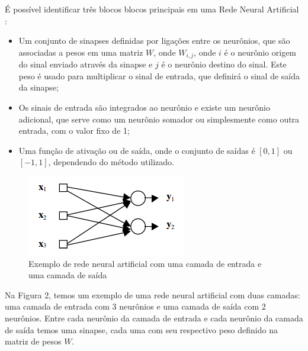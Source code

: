 \documentclass[
	12pt,				%
	openright,			%
	oneside,
	a4paper,			%
	english,			%
	french,				%
	spanish,			%
	brazil				%
	]{abntex2}
\begin{document}
    É possível identificar três blocos blocos principais em uma Rede Neural Artificial \cite{ruano2003}:
    \begin{itemize}
        \item 
            Um conjunto de sinapses definidas por ligações entre os neurônios, que são associadas a pesos em uma matriz $W$, onde $W_{i,j}$, onde $i$ é o neurônio origem do sinal enviado através da sinapse e $j$ é o neurônio destino do sinal. Este peso é usado para multiplicar o sinal de entrada, que definirá o sinal de saída da sinapse;
        \item 
            Os sinais de entrada são integrados ao neurônio e existe um neurônio adicional, que serve como um neurônio somador ou simplesmente como outra entrada, com o valor fixo de 1;
        \item 
            Uma função de ativação ou de saída, onde o conjunto de saídas é $[0,1]$ ou $[-1,1]$, dependendo do método utilizado.
    \end{itemize}
    
    \begin{figure}[ht]
        \caption{\label{ann_example}Exemplo de rede neural artificial com uma camada de entrada e uma camada de saída}
        
        \begin{center}
            \includegraphics[]{single_layer_network.png}
        \end{center}
        
    \end{figure}
    
    Na Figura 2, temos um exemplo de uma rede neural artificial com duas camadas: uma camada de entrada com 3 neurônios e uma camada de saída com 2 neurônios. Entre cada neurônio da camada de entrada e cada neurônio da camada de saída temos uma sinapse, cada uma com seu respectivo peso definido na matriz de pesos $W$.
    
\end{document}
